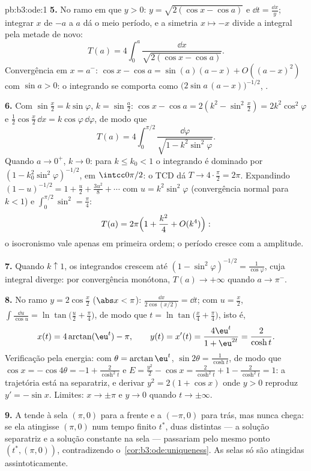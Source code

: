 \begin{solution}{pb:b3:ode:1}
\textbf{5.} No ramo em que $y > 0$: $y = \sqrt{2(\cos x
- \cos a)}$ e $\dd t = \frac{\dd x}{y}$; integrar $x$
de $-a$ a $a$ dá o meio período, e a simetria $x
\mapsto -x$ divide a integral pela metade de novo:
\[
T(a) = 4\int_0^a\frac{\dd x}{\sqrt{2(\cos x - \cos a)}} .
\]
Convergência em $x = a^-$: $\cos x - \cos a = \sin(a)(a - x) +
O((a-x)^2)$ com $\sin a > 0$: o integrando se comporta como
$\bigl(2\sin a\,(a - x)\bigr)^{-1/2}$, .

\textbf{6.} Com $\sin\frac x2 = k\sin\varphi$, $k =
\sin\frac a2$: $\cos x - \cos a = 2(k^2 - \sin^2\frac x2)
= 2k^2\cos^2\varphi$ e $\frac12\cos\frac x2\,\dd x =
k\cos\varphi\,\dd\varphi$, de modo que
\[
T(a) = 4\int_0^{\pi/2}
\frac{\dd\varphi}{\sqrt{1 - k^2\sin^2\varphi}} .
\]
Quando $a \to 0^+$, $k \to 0$: para $k \leq k_0 < 1$ o
integrando é dominado por $(1 - k_0^2\sin^2\varphi)^{-1/2}$,
 em $\intcc0{\pi/2}$: o TCD dá $T \to
4\cdot\frac\pi2 = 2\pi$. Expandindo $(1 - u)^{-1/2} = 1 +
\frac u2 + \frac{3u^2}8 + \cdots$ com $u =
k^2\sin^2\varphi$ (convergência normal para $k < 1$) e
$\int_0^{\pi/2}\sin^2 = \frac\pi4$:
\[
T(a) = 2\pi\Bigl(1 + \frac{k^2}{4} + O(k^4)\Bigr) :
\]
o isocronismo vale apenas em primeira ordem; o período cresce com
a amplitude.

\textbf{7.} Quando $k \uparrow 1$, os integrandos crescem até $(1
- \sin^2\varphi)^{-1/2} = \frac1{\cos\varphi}$, cuja
integral diverge: por convergência monótona, $T(a) \to
+\infty$ quando $a \to \pi^-$.

\textbf{8.} No ramo $y = 2\cos\frac x2$ ($\abs x <
\pi$): $\frac{\dd x}{2\cos(x/2)} = \dd t$; com $u = \frac
x2$, $\int\frac{\dd u}{\cos u} =
\ln\tan\bigl(\frac u2 + \frac\pi4\bigr)$, de modo que $t =
\ln\tan\bigl(\frac x4 + \frac\pi4\bigr)$, isto é,
\[
x(t) = 4\arctan(\eu^t) - \pi,
\qquad y(t) = x'(t) = \frac{4\eu^t}{1 + \eu^{2t}} =
\frac{2}{\cosh t} .
\]
Verificação pela energia: com $\theta = \arctan\eu^t$,
$\sin2\theta = \frac1{\cosh t}$, de modo que $\cos x = -\cos4\theta =
-1 + \frac{2}{\cosh^2t}$ e $E = \frac{y^2}2 - \cos x =
\frac2{\cosh^2t} + 1 - \frac2{\cosh^2t} = 1$: a trajetória
está na separatriz, e derivar $y^2 = 2(1 +
\cos x)$ onde $y > 0$ reproduz $y' = -\sin x$. Limites: $x
\to \pm\pi$ e $y \to 0$ quando $t \to \pm\infty$.

\textbf{9.} A  tende à sela $(\pi, 0)$ para a frente
e a $(-\pi, 0)$ para trás, mas nunca chega: se ela atingisse
$(\pi, 0)$ num tempo finito $t^*$, duas 
distintas --- a solução separatriz e a solução constante
na sela --- passariam pelo mesmo ponto
$(t^*, (\pi, 0))$, contradizendo
o~\cref{cor:b3:ode:uniqueness}. As selas só são atingidas
assintoticamente.


\end{solution}
